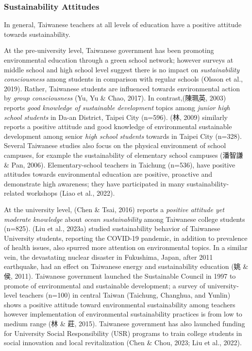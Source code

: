 \documentclass[
  letterpaper,
  DIV=11,
  numbers=noendperiod]{scrartcl}
\begin{document}
\subsubsection{Sustainability Attitudes}\label{sustainability-attitudes}

In general, Taiwanese teachers at all levels of education have a
positive attitude towards sustainability.

At the pre-university level, Taiwanese government has been promoting
environmental education through a green school network; however surveys
at middle school and high school level suggest there is no impact on
\emph{sustainability consciousness} among students in comparison with
regular schools (Olsson et al., 2019). Rather, Taiwanese students are
influenced towards environmental action by \emph{group consciousness}
(Yu, Yu \& Chao, 2017). In contrast,(陳珮英, 2003) reports \emph{good
knowledge of sustainable development} topics among \emph{junior high
school students} in Da-an District, Taipei City (n=596). (林, 2009)
similarly reports a positive attitude and good knowledge of
environmental sustainable development among senior \emph{high school
students} towards in Taipei City (n=328). Several Taiwanese studies also
focus on the physical environment of school campuses, for example the
sustainability of elementary school campuses (潘智謙 \& Pan, 2006).
Elementary-school teachers in Taichung (n=536), have positive attitudes
towards environmental education are positive, proactive and demonstrate
high awareness; they have participated in many sustainability-related
workshops (Liao et al., 2022).

At the university level, (Chen \& Tsai, 2016) reports a \emph{positive
attitude yet moderate knowledge} about \emph{ocean sustainability} among
Taiwanese college students (n=825). (Liu et al., 2023a) studied
sustainability behavior of Taiwanese University students, reporting the
COVID-19 pandemic, in addition to prevalence of health issues, also
spurred more attention on environmental topics. In a similar vein, the
devastating nuclear disaster in Fukushima, Japan, after 2011 earthquake,
had an effect on Taiwanese energy and sustainability education (姚 \&
侯, 2011). Taiwanese government launched the Sustainable Council in 1997
to promote of environmental and sustainable development; a survey of
university-level teachers (n=100) in central Taiwan (Taichung, Changhua,
and Yunlin) shows a positive attitude toward environmental
sustainability among teachers however implementation of environmental
sustainability practices is from low to medium range (林 \& 莊, 2015).
Taiwanese government has also launched funding for University Social
Responsibility (USR) programs to train college students in social
innovation and local revitalization (Chen \& Chou, 2023; Liu et al.,
2022).
\end{document}
